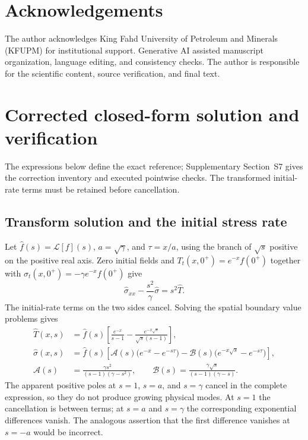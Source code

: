\documentclass[11pt]{article}
\begin{document}
\section*{Acknowledgements}
The author acknowledges King Fahd University of Petroleum and Minerals
(KFUPM) for institutional support. Generative AI assisted manuscript
organization, language editing, and consistency checks. The author is
responsible for the scientific content, source verification, and final text.

\appendix
\section{Corrected closed-form solution and verification}
\label{app:exact}

The expressions below define the exact reference; Supplementary
Section~S7 gives the correction inventory and executed pointwise checks.
The transformed initial-rate terms must be retained before cancellation.

\subsection{Transform solution and the initial stress rate}

Let $\widehat f(s)=\mathcal L[f](s)$, $a=\sqrt\gamma$, and
$\tau=x/a$, using the branch of $\sqrt s$ positive on the positive real axis.
Zero initial fields and
$T_t(x,0^+)=e^{-x}f(0^+)$ together with
$\sigma_t(x,0^+)=-\gamma e^{-x}f(0^+)$ give
\begin{equation}
 \widehat\sigma_{xx}-\frac{s^2}{\gamma}\widehat\sigma
 =s^2\widehat T.
\end{equation}
The initial-rate terms on the two sides cancel. Solving the spatial boundary
value problems gives
\begin{align}
 \widehat T(x,s)
 &=\widehat f(s)\left[
 \frac{e^{-x}}{s-1}-\frac{e^{-x\sqrt s}}{\sqrt s(s-1)}\right],\\
 \widehat\sigma(x,s)
 &=\widehat f(s)\left[
 \mathcal{A}(s)\bigl(e^{-x}-e^{-s\tau}\bigr)
 -\mathcal{B}(s)\bigl(e^{-x\sqrt s}-e^{-s\tau}\bigr)\right],\\
 \mathcal{A}(s)&=\frac{\gamma s^2}{(s-1)(\gamma-s^2)},\qquad
 \mathcal{B}(s)=\frac{\gamma\sqrt s}{(s-1)(\gamma-s)}.
\end{align}
The apparent positive poles at $s=1$, $s=a$, and $s=\gamma$ cancel in
the complete expression, so they do not produce growing physical modes.
At $s=1$ the cancellation is between terms; at $s=a$ and $s=\gamma$
the corresponding exponential differences vanish. The analogous assertion
that the first difference vanishes at $s=-a$ would be incorrect.
\end{document}
